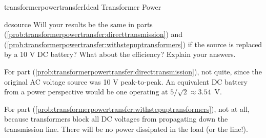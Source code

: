 \begin{mainquestion}{transformerpowertransfer}{Ideal Transformer Power}
\begin{partquestion}{dcsource}
{Will your results be the same in parts (\cref{prob:transformerpowertransfer:directtransmission}) and (\cref{prob:transformerpowertransfer:withstepuptransformers}) if the source is replaced by a 10 V DC battery? What about the efficiency? Explain your answers.}

\begin{answer}
For part (\cref{prob:transformerpowertransfer:directtransmission}), not quite, since the original AC voltage source was 10 V peak-to-peak. An equivalent DC battery from a power perspective would be one operating at $5/\sqrt{2} \approx 3.54$~V.

For part (\cref{prob:transformerpowertransfer:withstepuptransformers}), not at all, because transformers block all DC voltages from propagating down the transmission line. There will be no power dissipated in the load (or the line!).
\end{answer}
\end{partquestion}

\end{mainquestion}
